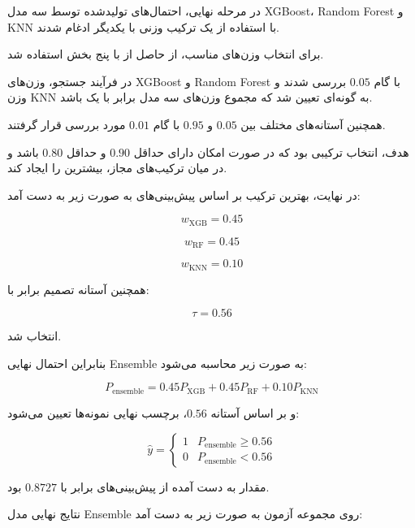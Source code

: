 \documentclass[10pt,a4paper,twocolumn]{article}
\begin{document}
در مرحله نهایی، احتمال‌های تولیدشده توسط سه مدل XGBoost،
Random Forest و KNN با استفاده از یک ترکیب وزنی با یکدیگر
ادغام شدند.

برای انتخاب وزن‌های مناسب، از
 حاصل از
 با پنج بخش استفاده شد.

در فرآیند جستجو، وزن‌های XGBoost و Random Forest با گام
$0.05$ بررسی شدند و وزن KNN به گونه‌ای تعیین شد که مجموع
وزن‌های سه مدل برابر با یک باشد.

همچنین آستانه‌های مختلف بین $0.05$ و $0.95$ با گام $0.01$
مورد بررسی قرار گرفتند.

هدف، انتخاب ترکیبی بود که در صورت امکان دارای
 حداقل $0.90$ و
 حداقل $0.80$ باشد و در میان ترکیب‌های مجاز،
بیشترین  را ایجاد کند.

در نهایت، بهترین ترکیب بر اساس پیش‌بینی‌های
 به صورت زیر به دست آمد:

\[
w_{\mathrm{XGB}} = 0.45
\]

\[
w_{\mathrm{RF}} = 0.45
\]

\[
w_{\mathrm{KNN}} = 0.10
\]

همچنین آستانه تصمیم برابر با:

\[
\tau = 0.56
\]

انتخاب شد.

بنابراین احتمال نهایی Ensemble به صورت زیر محاسبه می‌شود:

\[
P_{\mathrm{ensemble}}
=
0.45P_{\mathrm{XGB}}
+
0.45P_{\mathrm{RF}}
+
0.10P_{\mathrm{KNN}}
\]

و بر اساس آستانه $0.56$، برچسب نهایی نمونه‌ها تعیین می‌شود:

\[
\hat{y}
=
\begin{cases}
1 & P_{\mathrm{ensemble}}\geq0.56\\
0 & P_{\mathrm{ensemble}}<0.56
\end{cases}
\]

مقدار  به دست آمده از پیش‌بینی‌های
 برابر با $0.8727$ بود.

نتایج نهایی مدل Ensemble روی مجموعه آزمون به صورت زیر
به دست آمد:
\end{document}
